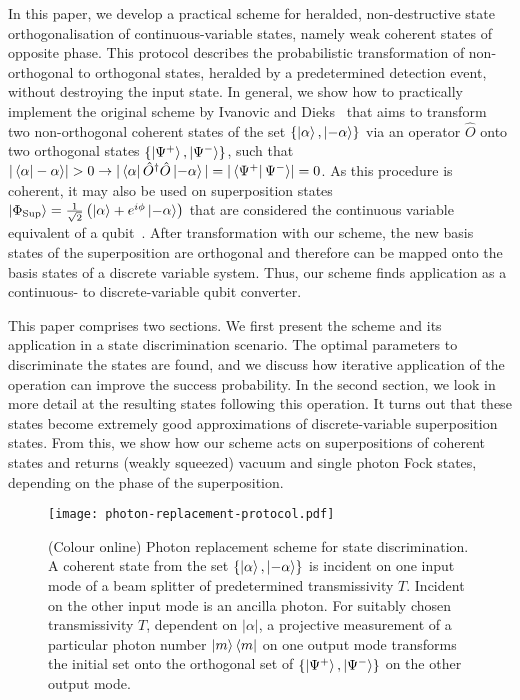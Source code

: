 \documentclass[aps,prl,twocolumn, superscriptaddress]{revtex4-1}
\begin{document}
In this paper, we develop a practical scheme for heralded, non-destructive state orthogonalisation of continuous-variable states, namely weak coherent states of opposite phase. This protocol describes the probabilistic transformation of non-orthogonal to orthogonal states, heralded by a predetermined detection event, without destroying the input state. In general, we show how to practically implement the original scheme by Ivanovic and Dieks~\cite{ivanovic_how_1987, dieks_overlap_1988} that aims to transform two non-orthogonal coherent states of the set $\{\ket{\alpha},\ket{-\alpha}\}$ via an operator $\hat{O}$ onto two orthogonal states $\{\ket{\Psi^+},\ket{\Psi^-}\}$, such that $|\bra{\alpha}-\alpha\rangle|>0 \rightarrow |\bra{\alpha}\hat{O}^\dagger \hat{O}\ket{-\alpha}|=|\bra{\Psi^+}\Psi^-\rangle|=0$.
As this procedure is coherent, it may also be used on superposition states $\ket{\Phi_\mathrm{Sup}}=\frac{1}{\sqrt{2}}\left(\ket{\alpha}+e^{i\phi}\ket{-\alpha}\right)$ that are considered the continuous variable equivalent of a qubit~\cite{cochrane_macroscopically_1999, jeong_efficient_2002, ralph_quantum_2003, lund_fault-tolerant_2008}. After transformation with our scheme, the new basis states of the superposition are orthogonal and therefore can be mapped onto the basis states of a discrete variable system. Thus, our scheme finds application as a continuous- to discrete-variable qubit converter.

This paper comprises two sections. We first present the scheme and its application in a state discrimination scenario. The optimal parameters to discriminate the states are found, and we discuss how iterative application of the operation can improve the success probability. In the second section, we look in more detail at the resulting states following this operation. It turns out that these states become extremely good approximations of discrete-variable superposition states. From this, we show how our scheme acts on superpositions of coherent states and returns (weakly squeezed) vacuum and single photon Fock states, depending on the phase of the superposition.
%
%
\begin{figure}
\texttt{[image: photon-replacement-protocol.pdf]}
\caption{(Colour online) Photon replacement scheme for state discrimination. A coherent state from the set $\{\ket{\alpha},\ket{-\alpha}\}$ is incident on one input mode of a beam splitter of predetermined transmissivity $T$. Incident on the other input mode is an ancilla photon. For suitably chosen transmissivity $T$, dependent on $|\alpha|$, a projective measurement of a particular photon number $\ket{m}\bra{m}$ on one output mode transforms the initial set onto the orthogonal set of $\{\ket{\Psi^+},\ket{\Psi^-}\}$ on the other output mode.}
\label{fig:replacement_scheme}
\end{figure}
%
\end{document}
